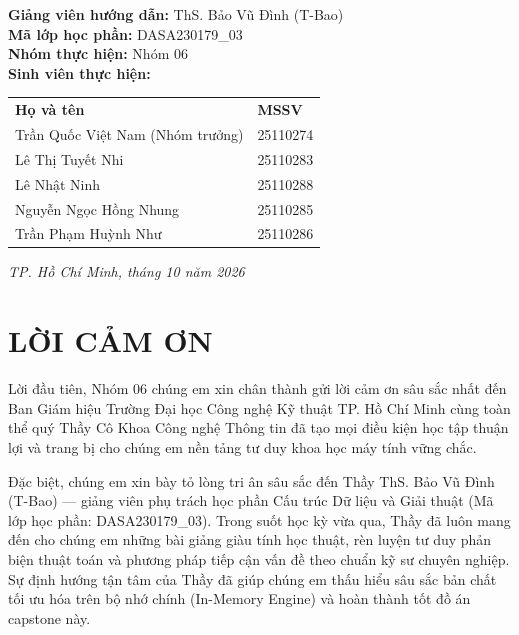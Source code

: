 \documentclass[14pt,a4paper]{extarticle}
\begin{document}
\begin{titlepage}
    \fontsize{14pt}{17pt}\selectfont
    \begin{flushleft}
        \hspace{1.2cm}\textbf{Giảng viên hướng dẫn:} ThS. Bảo Vũ Đình (T-Bao)\\[0.15cm]
        \hspace{1.2cm}\textbf{Mã lớp học phần:} DASA230179\_03\\[0.15cm]
        \hspace{1.2cm}\textbf{Nhóm thực hiện:} Nhóm 06\\[0.15cm]
        \hspace{1.2cm}\textbf{Sinh viên thực hiện:}\\[0.1cm]
        \hspace{1.5cm}\begin{tabular}{ll}
            \textbf{Họ và tên} & \textbf{MSSV} \\
            Trần Quốc Việt Nam (Nhóm trưởng) & 25110274 \\
            Lê Thị Tuyết Nhi & 25110283 \\
            Lê Nhật Ninh & 25110288 \\
            Nguyễn Ngọc Hồng Nhung & 25110285 \\
            Trần Phạm Huỳnh Như & 25110286 \\
        \end{tabular}
    \end{flushleft}

    \vfill
    \fontsize{14pt}{17pt}\selectfont
    \textit{TP. Hồ Chí Minh, tháng 10 năm 2026}
\end{titlepage}

\newpage
\thispagestyle{empty}
\section*{LỜI CẢM ƠN}

Lời đầu tiên, Nhóm 06 chúng em xin chân thành gửi lời cảm ơn sâu sắc nhất đến Ban Giám hiệu Trường Đại học Công nghệ Kỹ thuật TP. Hồ Chí Minh cùng toàn thể quý Thầy Cô Khoa Công nghệ Thông tin đã tạo mọi điều kiện học tập thuận lợi và trang bị cho chúng em nền tảng tư duy khoa học máy tính vững chắc.

Đặc biệt, chúng em xin bày tỏ lòng tri ân sâu sắc đến Thầy ThS. Bảo Vũ Đình (T-Bao) --- giảng viên phụ trách học phần Cấu trúc Dữ liệu và Giải thuật (Mã lớp học phần: DASA230179\_03). Trong suốt học kỳ vừa qua, Thầy đã luôn mang đến cho chúng em những bài giảng giàu tính học thuật, rèn luyện tư duy phản biện thuật toán và phương pháp tiếp cận vấn đề theo chuẩn kỹ sư chuyên nghiệp. Sự định hướng tận tâm của Thầy đã giúp chúng em thấu hiểu sâu sắc bản chất tối ưu hóa trên bộ nhớ chính (In-Memory Engine) và hoàn thành tốt đồ án capstone này.
\end{document}
